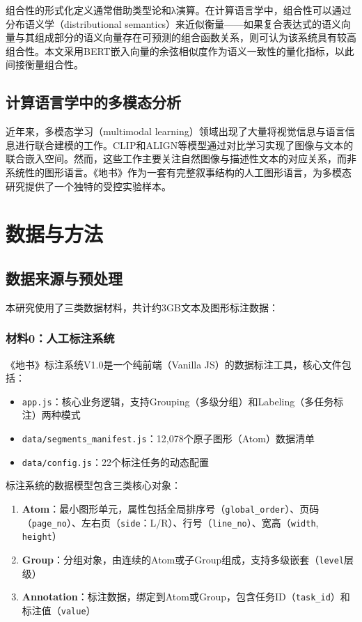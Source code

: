 \documentclass[a4paper,12pt]{article}
\begin{document}
组合性的形式化定义通常借助类型论和λ演算\cite{montague1970}。在计算语言学中，组合性可以通过分布语义学（distributional semantics）来近似衡量——如果复合表达式的语义向量与其组成部分的语义向量存在可预测的组合函数关系，则可认为该系统具有较高组合性\cite{mitchell2010}。本文采用BERT嵌入向量的余弦相似度作为语义一致性的量化指标，以此间接衡量组合性。

\subsection{计算语言学中的多模态分析}

近年来，多模态学习（multimodal learning）领域出现了大量将视觉信息与语言信息进行联合建模的工作。CLIP\cite{radford2021}和ALIGN\cite{jia2021}等模型通过对比学习实现了图像与文本的联合嵌入空间。然而，这些工作主要关注自然图像与描述性文本的对应关系，而非系统性的图形语言。《地书》作为一套有完整叙事结构的人工图形语言，为多模态研究提供了一个独特的受控实验样本。

\section{数据与方法}\label{sec:method}

\subsection{数据来源与预处理}

本研究使用了三类数据材料，共计约3GB文本及图形标注数据：

\subsubsection{材料0：人工标注系统}

《地书》标注系统V1.0是一个纯前端（Vanilla JS）的数据标注工具，核心文件包括：
\begin{itemize}
    \item \texttt{app.js}：核心业务逻辑，支持Grouping（多级分组）和Labeling（多任务标注）两种模式
    \item \texttt{data/segments\_manifest.js}：12,078个原子图形（Atom）数据清单
    \item \texttt{data/config.js}：22个标注任务的动态配置
\end{itemize}

标注系统的数据模型包含三类核心对象：
\begin{enumerate}
    \item \textbf{Atom}：最小图形单元，属性包括全局排序号（\texttt{global\_order}）、页码（\texttt{page\_no}）、左右页（\texttt{side}：L/R）、行号（\texttt{line\_no}）、宽高（\texttt{width}, \texttt{height}）
    \item \textbf{Group}：分组对象，由连续的Atom或子Group组成，支持多级嵌套（\texttt{level}层级）
    \item \textbf{Annotation}：标注数据，绑定到Atom或Group，包含任务ID（\texttt{task\_id}）和标注值（\texttt{value}）
\end{enumerate}
\end{document}
